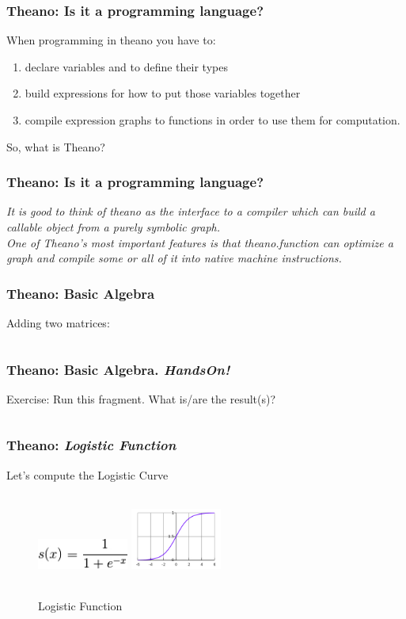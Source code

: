 \documentclass[aspectratio=169]{beamer}
\begin{document}
\begin{frame}
\frametitle{Theano: Is it a programming language?}
When programming in theano you have to:
\begin{enumerate}
\item  declare variables and to define their types
\item  build expressions for how to put those variables together
\item  compile expression graphs to functions in order to use them for computation.
\end{enumerate}
So, what is Theano?
\end{frame}

\begin{frame}
\frametitle{Theano: Is it a programming language?}
\emph{It is good to think of theano as the interface to a compiler which can build a callable object from a purely symbolic graph. 
\\[1.0cm]
One of Theano’s most important features is that theano.function can optimize a graph and compile some or all of it into native machine instructions. }
\end{frame}

\begin{frame}
\frametitle{Theano: Basic Algebra}
Adding two matrices:
\inputminted{python}{./aux_files/t5.py}
\end{frame}

\begin{frame}
\frametitle{Theano: Basic Algebra. \textit{HandsOn!} }
Exercise: Run this fragment. What is/are the result(s)?  
\\[0.5cm]
\inputminted{python}{./aux_files/t6.py}
\end{frame}

\begin{frame}
\frametitle{Theano: \textit{Logistic Function} }
Let's compute the Logistic Curve
\begin{figure}
\includegraphics[width=3cm,height=2cm]{./aux_files/t1.jpg}
\includegraphics[width=3cm,height=3cm]{./aux_files/t2.jpg}
\caption{Logistic Function}
\label{fig:Logistic Function}
\end{figure}
\end{frame}
\end{document}
